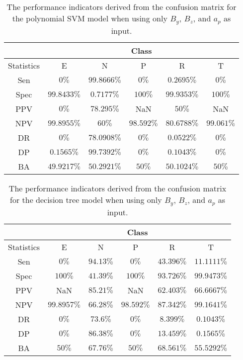\begin{table}[!ht]
	\centering
	\begin{tabular}{|c|c|c|c|c|c|}
		\hline
		 & \multicolumn{5}{c|}{Class} \\ \hline
		Statistics & E & N & P & R & T \\ \hline
		Sen & $0\%$ & $99.8666\%$ & $0\%$ & $0.2695\%$ & $0\%$ \\ \hline
		Spec & $99.8433\%$ & $0.7177\%$ & $100\%$ & $99.9353\%$ & $100\%$ \\ \hline
		PPV & $0\%$ & $78.295\%$ & NaN & $50\%$ & NaN \\ \hline
		NPV & $99.8955\%$ & $60\%$ & $98.592\%$ & $80.6788\%$ & $99.061\%$ \\ \hline
		DR & $0\%$ & $78.0908\%$ & $0\%$ & $0.0522\%$ & $0\%$ \\ \hline
		DP & $0.1565\%$ & $99.7392\%$ & $0\%$ & $0.1043\%$ & $0\%$ \\ \hline
		BA & $49.9217\%$ & $50.2921\%$ & $50\%$ & $50.1024\%$ & $50\%$ \\ \hline
	\end{tabular}
	\caption{The performance indicators derived from the confusion matrix for the polynomial SVM model when using only $B_{y}$, $B_{z}$, and $a_{p}$ as input.}
	\label{tab:cs:reverse:yzap:svmPoly}
\end{table}

\begin{table}[!ht]
	\centering
	\begin{tabular}{|c|c|c|c|c|c|}
		\hline
		 & \multicolumn{5}{c|}{Class} \\ \hline
		Statistics & E & N & P & R & T \\ \hline
		Sen & $0\%$ & $94.13\%$ & $0\%$ & $43.396\%$ & $11.1111\%$ \\ \hline
		Spec & $100\%$ & $41.39\%$ & $100\%$ & $93.726\%$ & $99.9473\%$ \\ \hline
		PPV & NaN & $85.21\%$ & NaN & $62.403\%$ & $66.6667\%$ \\ \hline
		NPV & $99.8957\%$ & $66.28\%$ & $98.592\%$ & $87.342\%$ & $99.1641\%$ \\ \hline
		DR & $0\%$ & $73.6\%$ & $0\%$ & $8.399\%$ & $0.1043\%$ \\ \hline
		DP & $0\%$ & $86.38\%$ & $0\%$ & $13.459\%$ & $0.1565\%$ \\ \hline
		BA & $50\%$ & $67.76\%$ & $50\%$ & $68.561\%$ & $55.5292\%$ \\ \hline
	\end{tabular}
	\caption{The performance indicators derived from the confusion matrix for the decision tree model when using only $B_{y}$, $B_{z}$, and $a_{p}$ as input.}
	\label{tab:cs:reverse:yzap:C5.0}
\end{table}

